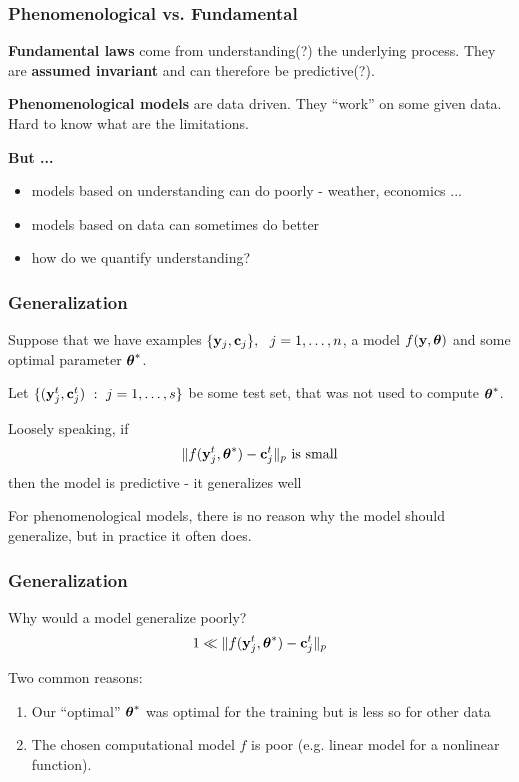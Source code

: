\documentclass[12pt,fleqn]{beamer}
\begin{document}
\begin{frame}\frametitle{Phenomenological vs. Fundamental}

\textbf{Fundamental laws} come from understanding(?) the underlying process.
They are {\bf assumed invariant} and can therefore be predictive(?).

\bigskip

\textbf{Phenomenological models} are data driven. They ``work'' on some given data.
Hard to know what are the limitations.

\bigskip

{\bf But ...}
\begin{itemize}
\item models based on understanding can do poorly - weather, economics ...
\item models based on data can sometimes do better
\item how do we quantify understanding?
\end{itemize}

\end{frame}


\begin{frame}\frametitle{Generalization}

Suppose that we have examples $\{{\bf y}_j,{\bf c}_j\},\ \ j=1,\ldots,n$,
a model $f({\bf y},{\boldsymbol \theta})$ and some optimal parameter ${\boldsymbol \theta}^*$.

Let $\{({\bf y}^t_j,{\bf c}^t_j) \ : \  j=1,\ldots,s\}$ be some test set, that was not used
to compute ${\boldsymbol \theta}^*$.

\pause

Loosely speaking, if
$$ \|f({\bf y}^t_j,{\boldsymbol \theta}^*) - {\bf c}_j^t\|_p \text{ is small}$$
then the model is predictive - it generalizes well



\pause
\bigskip


For phenomenological models, there is no reason why the model
should generalize, but in practice it often does.


\end{frame}

\begin{frame}\frametitle{Generalization}


Why would a model generalize poorly?
$$ 1 \ll \|f({\bf y}^t_j,{\boldsymbol \theta}^*) - {\bf c}_j^t\|_p $$

\bigskip
\pause

Two common reasons:
\begin{enumerate}
\item Our ``optimal'' ${\boldsymbol \theta}^*$ was optimal for the training but is less so for other data
\item The chosen computational model $f$ is poor (e.g. linear model for a nonlinear function).
\end{enumerate}


\end{frame}
\end{document}
